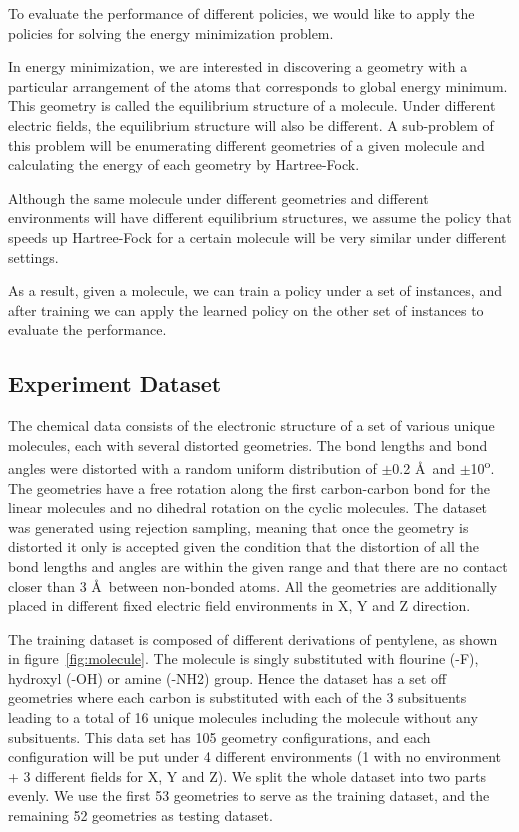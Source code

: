 \documentclass[twoside,11pt]{article}
\begin{document}
To evaluate the performance of different policies, we would like to apply the policies for solving the energy minimization problem.

In energy minimization, we are interested in discovering a geometry with a particular arrangement of the atoms that corresponds to global energy minimum. This geometry is called the equilibrium structure of a molecule. Under different electric fields, the equilibrium structure will also be different. A sub-problem of this problem will be enumerating different geometries of a given molecule and calculating the energy of each geometry by Hartree-Fock. 

 
Although the same molecule under different geometries and different environments will have different equilibrium structures, we assume the policy that speeds up Hartree-Fock for a certain molecule will be very similar under different settings. 

As a result, given a molecule, we can train a policy under a set of instances, and after training we can apply the learned policy on the other set of instances to evaluate the performance. 
 
\subsection{Experiment Dataset}

The chemical data consists of the electronic structure of a set of various unique molecules, each with several distorted geometries. The bond lengths and bond angles were distorted with a random uniform distribution of $\pm$0.2 \AA\ and $\pm$10\textsuperscript{o}. The geometries have a free rotation along the first carbon-carbon bond for the linear molecules and no dihedral rotation on the cyclic molecules. The dataset was generated using rejection sampling, meaning that once the geometry is distorted it only is accepted given the condition that the distortion of all the bond lengths and angles are within the given range and that there are no contact closer than 3 \AA\ between non-bonded atoms. All the geometries are additionally placed in different fixed electric field environments in X, Y and Z direction. 

The training dataset is composed of different derivations of pentylene, as shown in figure~\ref{fig:molecule}. The molecule is singly substituted with flourine (-F), hydroxyl (-OH) or amine (-NH2) group. Hence the dataset has a set off geometries where each carbon is substituted with each of the 3 subsituents leading to a total of 16 unique molecules including the molecule without any subsituents. This data set has 105 geometry configurations, and each configuration will be put under 4 different environments (1 with no environment + 3 different fields for X, Y and Z).  We split the whole dataset into two parts evenly. We use the first 53 geometries to serve as the training dataset, and the remaining 52 geometries as testing dataset.
\end{document}
